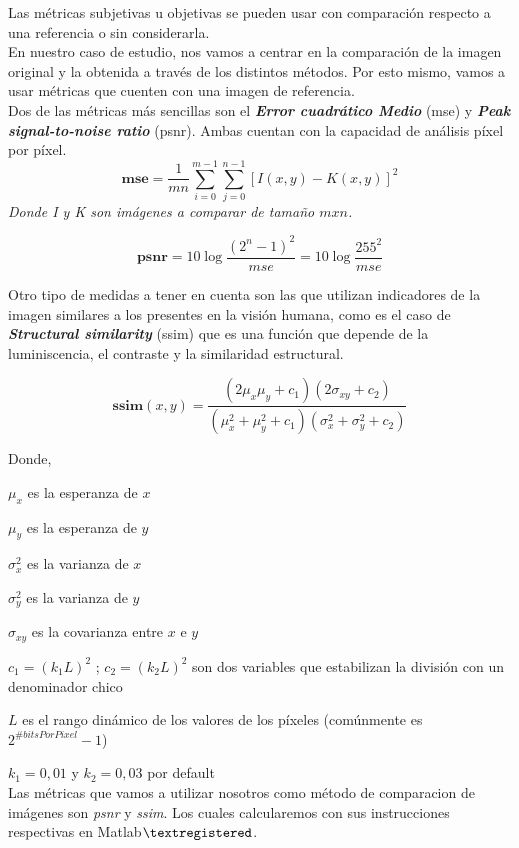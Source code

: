 \documentclass[a4paper]{article}
\begin{document}
Las métricas subjetivas u objetivas se pueden usar con comparación respecto a una referencia o sin considerarla.\\

En nuestro caso de estudio, nos vamos a centrar en la comparaci\'on de la imagen original y la obtenida a trav\'es de los distintos m\'etodos. Por esto mismo, vamos a usar m\'etricas que cuenten con una imagen de referencia.\\

 Dos de las m\'etricas m\'as sencillas son el \emph{\textbf{Error cuadr\'atico Medio}} (mse) y \emph{\textbf{Peak signal-to-noise ratio}} (psnr). Ambas cuentan con la capacidad de an\'alisis p\'ixel por p\'ixel.\\

\[
 \textbf{mse} = \frac{1}{mn} \sum_{i=0}^{m-1} \sum_{j=0}^{n-1} [I(x,y) - K(x,y)]^2
\]
  \indent \indent \indent \textit{Donde I y K son imágenes a comparar de tamaño $mxn$.}



\[
 \textbf{psnr} = 10 \log \frac{(2^n-1)^2}{mse} = 10 \log \frac{255^2}{mse}
\]

Otro tipo de medidas a tener en cuenta son las que utilizan indicadores de la imagen similares a los presentes en la visi\'on humana, como es el caso de \emph{\textbf{Structural similarity}} (ssim) que es una funci\'on que depende de la luminiscencia, el contraste y la similaridad estructural.

\[
 \textbf{ssim}(x,y) = \frac{(2\mu_x\mu_y+c_1)(2\sigma_{xy}+c_2)}{(\mu_x^2+\mu_y^2+c_1)(\sigma_x^2+\sigma_y^2+c_2)}
\]

\noindent Donde, 

$\mu_x$ es la esperanza de $x$

$\mu_y$ es la esperanza de $y$

$\sigma_x^2$ es la varianza de $x$

$\sigma_y^2$ es la varianza de $y$

$\sigma_{xy}$ es la covarianza entre $x$ e $y$

$c_1 = (k_1L)^2$ ; $c_2 = (k_2L)^2$ son dos variables que estabilizan la divisi\'on con un denominador chico

$L$ es el rango din\'amico de los valores de los p\'ixeles (com\'unmente es $2^{\#bitsPorPixel}-1$)

$k_1 = 0,01$ y $k_2 = 0,03$ por default\\

Las m\'etricas que vamos a utilizar nosotros como m\'etodo de comparacion de im\'agenes son \emph{psnr} y \emph{ssim}. Los cuales calcularemos con sus instrucciones respectivas en Matlab$\textregistered$.
\end{document}
